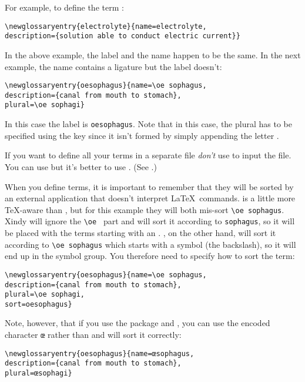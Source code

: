 \documentclass{nlctdoc}
\newcommand*{\gloskey}[2][newglossaryentry]{\csopt{#1}{#2}}
\begin{document}
For example, to define the term :
\begin{verbatim}
\newglossaryentry{electrolyte}{name=electrolyte,
description={solution able to conduct electric current}}
\end{verbatim}
In the above example, the label and the name happen to be the same.
In the next example, the name contains a ligature but the label
doesn't:
\begin{verbatim}
\newglossaryentry{oesophagus}{name=\oe sophagus,
description={canal from mouth to stomach},
plural=\oe sophagi}
\end{verbatim}
In this case the label is \texttt{oesophagus}. Note that in this
case, the plural has to be specified using the \gloskey{plural} key
since it isn't formed by simply appending the letter . 

\begin{important}
If you want to define all your terms in a separate file \emph{don't}
use  to input the file. You can use  but
it's better to use . (See
.)
\end{important}

When you define terms, it is important to remember that they will
be sorted by an external application that doesn't interpret \LaTeX\
commands.  is a little more \TeX-aware than , but
for this example they will both mis-sort \verb|\oe sophagus|.
Xindy will ignore the \verb*|\oe | part and will sort it according
to \texttt{sophagus}, so it will be placed with the terms starting
with an \qt{s}. \app{makeindex}, on the other hand, will sort it according
to \verb*|\oe sophagus| which starts with a symbol (the backslash),
so it will end up in the symbol group. You therefore need to 
specify how to sort the term:
\begin{verbatim}
\newglossaryentry{oesophagus}{name=\oe sophagus,
description={canal from mouth to stomach},
plural=\oe sophagi,
sort=oesophagus}
\end{verbatim}
Note, however, that if you use the  package and
, you can use the encoded character \texttt{œ} rather than
\cs{oe} and \app{xindy} will sort it correctly:
\begin{verbatim}
\newglossaryentry{oesophagus}{name=œsophagus,
description={canal from mouth to stomach},
plural=œsophagi}
\end{verbatim}
\end{document}

